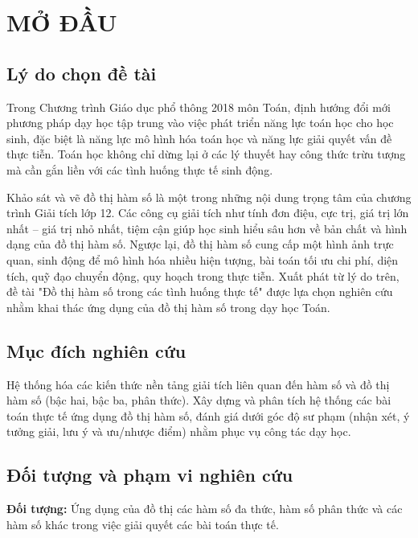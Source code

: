 \documentclass[12pt,a4paper,oneside]{book}
\theoremstyle{theorem}
\theoremstyle{definition}
\begin{document}
	
	
	
	
	\chapter*{MỞ ĐẦU}

           \section*{Lý do chọn đề tài} Trong Chương trình Giáo dục phổ thông 2018 môn Toán, định hướng đổi mới phương pháp dạy học tập trung vào việc phát triển năng lực toán học cho học sinh, đặc biệt là năng lực mô hình hóa toán học và năng lực giải quyết vấn đề thực tiễn. Toán học không chỉ dừng lại ở các lý thuyết hay công thức trừu tượng mà cần gắn liền với các tình huống thực tế sinh động.
           
           Khảo sát và vẽ đồ thị hàm số là một trong những nội dung trọng tâm của chương trình Giải tích lớp 12. Các công cụ giải tích như tính đơn điệu, cực trị, giá trị lớn nhất – giá trị nhỏ nhất, tiệm cận giúp học sinh hiểu sâu hơn về bản chất và hình dạng của đồ thị hàm số. Ngược lại, đồ thị hàm số cung cấp một hình ảnh trực quan, sinh động để mô hình hóa nhiều hiện tượng, bài toán tối ưu chi phí, diện tích, quỹ đạo chuyển động, quy hoạch trong thực tiễn. Xuất phát từ lý do trên, đề tài "Đồ thị hàm số trong các tình huống thực tế" được lựa chọn nghiên cứu nhằm khai thác ứng dụng của đồ thị hàm số trong dạy học Toán.   
           
           \section*{Mục đích nghiên cứu} Hệ thống hóa các kiến thức nền tảng giải tích liên quan đến hàm số và đồ thị hàm số (bậc hai, bậc ba, phân thức).  Xây dựng và phân tích hệ thống các bài toán thực tế ứng dụng đồ thị hàm số, đánh giá dưới góc độ sư phạm (nhận xét, ý tưởng giải, lưu ý và ưu/nhược điểm) nhằm phục vụ công tác dạy học.   
           \section*{Đối tượng và phạm vi nghiên cứu}
           \textbf{Đối tượng:} Ứng dụng của đồ thị các hàm số đa thức, hàm số phân thức và các hàm số khác trong việc giải quyết các bài toán thực tế.   
           
\end{document}
